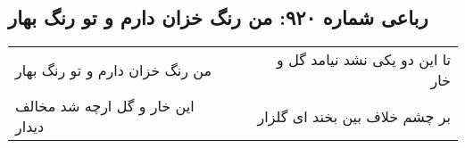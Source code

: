 \begin{center}
\section*{رباعی شماره ۹۲۰: من رنگ خزان دارم و تو رنگ بهار}
\label{sec:0920}
\begin{longtable}{l p{0.5cm} r}
من رنگ خزان دارم و تو رنگ بهار
&&
تا این دو یکی نشد نیامد گل و خار
\\
این خار و گل ارچه شد مخالف دیدار
&&
بر چشم خلاف بین بخند ای گلزار
\\
\end{longtable}
\end{center}
